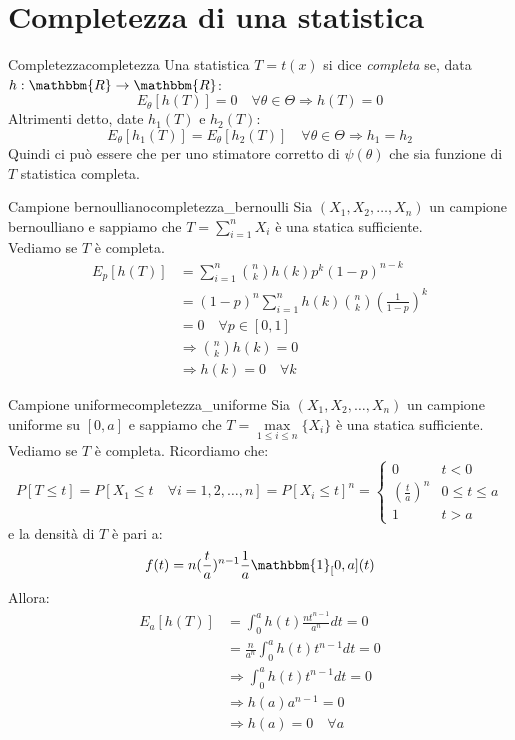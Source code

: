 \documentclass[12pt]{report}
\newcounter{definition}
\newcommand{\nmu}{}
\begin{document}
 		\section{Completezza di una statistica}
 		\begin{definition}{\nmu Completezza}{completezza}
 			Una statistica $T = t(x)$ si dice \textit{completa} se, data $h: \mathbbm{R} \to \mathbbm{R}$:
 			\[
 			E_\theta[h(T)] = 0 \quad \forall \theta \in \Theta \Rightarrow h(T) = 0
 			\]
 			Altrimenti detto, date $h_1(T)$ e $h_2(T)$:
 			\[
 			E_\theta[h_1(T)] = E_\theta[h_2(T)] \quad \forall \theta \in \Theta \Rightarrow h_1 = h_2
 			\]
 			Quindi ci può essere che per uno stimatore corretto di $\psi(\theta)$ che sia funzione di $T$ statistica completa.
 		\end{definition}
 		\begin{example}{\nmu Campione bernoulliano}{completezza_bernoulli}
 			Sia $(X_1, X_2, \dots, X_n)$ un campione bernoulliano e sappiamo che $T = \sum_{i=1}^{n}X_i$ è una statica sufficiente. \\
 			Vediamo se $T$ è completa.
 			\begin{align*}
 				E_p[h(T)] &= \sum_{i=1}^{n}\binom{n}{k}h(k)p^k(1-p)^{n-k} \\
 				&= (1-p)^n\sum_{i=1}^{n}h(k)\binom{n}{k}(\frac{1}{1-p})^k \\
 				&= 0 \quad \forall p \in [0, 1] \\
 				&\Rightarrow \binom{n}{k}h(k) = 0 \\
 				&\Rightarrow h(k) = 0 \quad \forall k
 			\end{align*}
 		\end{example}
 		\begin{example}{\nmu Campione uniforme}{completezza_uniforme}
 			Sia $(X_1, X_2, \dots, X_n)$ un campione uniforme su $[0, a]$ e sappiamo che $T = \underset{1 \leq i \leq n}{\max}\{X_i\}$ è una statica sufficiente. \\
 			Vediamo se $T$ è completa.
 			Ricordiamo che:
 			\[
 			P[T \leq t] = P[X_1 \leq t \quad \forall i = 1, 2,  \dots, n] = P[X_i \leq t]^n = \begin{cases}
 				0 & t < 0 \\
 				(\frac{t}{a})^n & 0 \leq t \leq a \\
 				1 & t > a
 			\end{cases}
 			\]
 			e la densità di $T$ è pari a:
 			\[
 			f(t) = n(\frac{t}{a})^{n-1}\frac{1}{a}\mathbbm{1}_[0, a](t)
 			\]
 			Allora:
 			\begin{align*}
 				E_a[h(T)] &= \int_{0}^{a}h(t)\frac{nt^{n-1}}{a^n}dt = 0 \\
 				&= \frac{n}{a^n}\int_{0}^{a}h(t)t^{n-1}dt = 0 \\
 				&\Rightarrow \int_{0}^{a}h(t)t^{n-1}dt = 0 \\
 				&\Rightarrow h(a)a^{n-1} = 0 \\
 				&\Rightarrow h(a) = 0 \quad \forall a
 			\end{align*}
 		\end{example}
\end{document}
